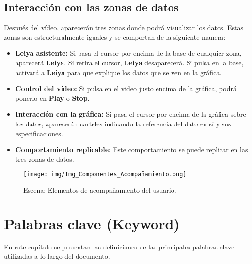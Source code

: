 \documentclass[a4paper, 12pt]{book}
\begin{document}
\section*{Interacción con las zonas de datos}

Después del vídeo, aparecerán tres zonas donde podrá visualizar los datos. Estas zonas son estructuralmente iguales y se comportan de la siguiente manera:

\begin{itemize}
    \item \textbf{Leiya asistente:} 
    Si pasa el cursor por encima de la base de cualquier zona, aparecerá \textbf{Leiya}. Si retira el cursor, \textbf{Leiya} desaparecerá. Si pulsa en la base, activará a \textbf{Leiya} para que explique los datos que se ven en la gráfica.
    
    \item \textbf{Control del vídeo:} 
    Si pulsa en el video justo encima de la gráfica, podrá ponerlo en \textbf{Play} o \textbf{Stop}.
    
    \item \textbf{Interacción con la gráfica:} 
    Si pasa el cursor por encima de la gráfica sobre los datos, aparecerán carteles indicando la referencia del dato en sí y sus especificaciones.
    
    \item \textbf{Comportamiento replicable:} 
    Este comportamiento se puede replicar en las tres zonas de datos.
\end{itemize}

            \begin{figure}[H]
                \centering
                \texttt{[image: img/Img\_Componentes\_Acompañamiento.png]}
                \caption{Escena: Elementos de acompañamiento del usuario.}
                \label{fig:Escena_Img_Componentes_Acompañamiento}
            \end{figure}

\chapter{Palabras clave (Keyword)}
\label{app:Keyword}

En este capítulo se presentan las definiciones de las principales palabras clave utilizadas a lo largo del documento.
\end{document}
